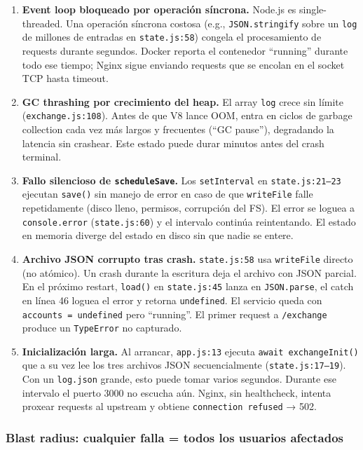 \begin{enumerate}[leftmargin=*]
    \item \textbf{Event loop bloqueado por operación síncrona.} Node.js es single-threaded. Una operación síncrona costosa (e.g., \texttt{JSON.stringify} sobre un \texttt{log} de millones de entradas en \texttt{state.js:58}) congela el procesamiento de requests durante segundos. Docker reporta el contenedor ``running'' durante todo ese tiempo; Nginx sigue enviando requests que se encolan en el socket TCP hasta timeout.
    \item \textbf{GC thrashing por crecimiento del heap.} El array \texttt{log} crece sin límite (\texttt{exchange.js:108}). Antes de que V8 lance OOM, entra en ciclos de garbage collection cada vez más largos y frecuentes (``GC pause''), degradando la latencia sin crashear. Este estado puede durar minutos antes del crash terminal.
    \item \textbf{Fallo silencioso de \texttt{scheduleSave}.} Los \texttt{setInterval} en \texttt{state.js:21–23} ejecutan \texttt{save()} sin manejo de error en caso de que \texttt{writeFile} falle repetidamente (disco lleno, permisos, corrupción del FS). El error se loguea a \texttt{console.error} (\texttt{state.js:60}) y el intervalo continúa reintentando. El estado en memoria diverge del estado en disco sin que nadie se entere.
    \item \textbf{Archivo JSON corrupto tras crash.} \texttt{state.js:58} usa \texttt{writeFile} directo (no atómico). Un crash durante la escritura deja el archivo con JSON parcial. En el próximo restart, \texttt{load()} en \texttt{state.js:45} lanza en \texttt{JSON.parse}, el catch en línea 46 loguea el error y retorna \texttt{undefined}. El servicio queda con \texttt{accounts = undefined} pero ``running''. El primer request a \texttt{/exchange} produce un \texttt{TypeError} no capturado.
    \item \textbf{Inicialización larga.} Al arrancar, \texttt{app.js:13} ejecuta \texttt{await exchangeInit()} que a su vez lee los tres archivos JSON secuencialmente (\texttt{state.js:17–19}). Con un \texttt{log.json} grande, esto puede tomar varios segundos. Durante ese intervalo el puerto 3000 no escucha aún. Nginx, sin healthcheck, intenta proxear requests al upstream y obtiene \texttt{connection refused} → 502.
\end{enumerate}

\subsubsection{Blast radius: cualquier falla = todos los usuarios afectados}

